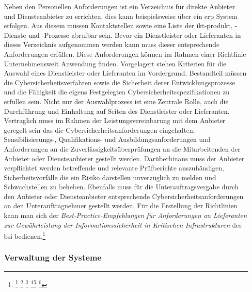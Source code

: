 \documentclass[11pt,a4paper,hidelinks]{article}   %
\begin{document}
            Neben den Personellen Anforderungen ist ein Verzeichnis für direkte Anbieter und Diensteanbieter zu errichten. dies kann beispielsweise über ein \gls{erp} System erfolgen. Aus diesem müssen Kontaktstellen sowie eine Liste der \gls{ikt-produkt}, -Dienste und -Prozesse abrufbar sein. Bevor ein Dienstleister oder Lieferanten in dieses Verzeichnis aufgenommen werden kann muss dieser entsprechende Anforderungen erfüllen. Diese Anforderungen können im Rahmen einer Richtlinie Unternehmensweit Anwendung finden. Vorgelagert stehen Kriterien für die Auswahl eines Dienstleister oder Lieferanten im Vordergrund. Bestandteil müssen die Cybersicherheitsverfahren sowie die Sicherheit derer Entwicklungsprozesse und die Fähigkeit die eigens Festgelegten Cybersicherheitsspezifikationen zu erfüllen sein. Nicht nur der Auswahlprozess ist eine Zentrale Rolle, auch die Durchführung und Einhaltung auf Seiten des Dienstleister oder Lieferanten. Vertraglich muss im Rahmen der Leistungsvereinbarung mit dem Anbieter geregelt sein das die Cybersicherheitsanforderungen eingehalten, Sensibilisierungs-, Qualifikations- und Ausbildungsanforderungen und Anforderungen an die Zuverlässigkeitsüberprüfungen an die Mitarbeitenden der Anbieter oder Diensteanbieter gestellt werden. Darüberhinaus muss der Anbieter verpflichtet werden betreffende und relevante Prüfberichte auszuhändigen, Sicherheitsvorfälle die ein Risiko darstellen unverzüglich zu melden und Schwachstellen zu beheben. Ebenfalls muss für die Unterauftragsvergabe durch den Anbieter oder Diensteanbieter entsprechende Cybersicherheitsanforderungen an den Unterauftragnehmer gestellt werden. Für die Erstellung der Richtlinien kann man sich der \emph{Best-Practice-Empfehlungen für Anforderungen an Lieferanten zur Gewährleistung der Informationssicherheit in Kritischen Infrastrukturen} des \gls{bsi} bedienen.\footnote{
                \footcite[Vgl. Nummer 5.2.][]{EU2024-2690}
                \footcite[Vgl. Nummer 8.2.1.][]{EU2024-2690}
                \footcite[Vgl. Nummer 10.1.2. Buchstabe a und b][]{EU2024-2690}
                \footcite[Vgl. S. 5][Best-Practice-Empfehlungen für Anforderungen an Lieferanten zur Gewährleistung der Informationssicherheit in Kritischen Infrastrukturen]{MISSING}\footcite[Vgl. Nummer 5.1.2.][]{EU2024-2690}
                \footcite[Vgl. Nummer 5.1.4.][]{EU2024-2690}
            }

        \subsubsection{Verwaltung der Systeme}
\end{document}
